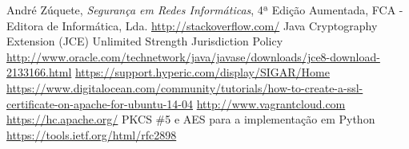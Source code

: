 \documentclass[pdftex,12pt,a4paper]{report}
\begin{document}
\begin{thebibliography}{} 
	 André Zúquete, \textit{Segurança em Redes Informáticas}, 4ª Edição Aumentada, FCA - Editora de Informática, Lda.
	 \url{http://stackoverflow.com/}
	 Java Cryptography Extension (JCE) Unlimited Strength Jurisdiction Policy \url{http://www.oracle.com/technetwork/java/javase/downloads/jce8-download-2133166.html}
	 \url{https://support.hyperic.com/display/SIGAR/Home}
	 \url{https://www.digitalocean.com/community/tutorials/how-to-create-a-ssl-certificate-on-apache-for-ubuntu-14-04}
	 \url{http://www.vagrantcloud.com}
	 \url{https://hc.apache.org/}
	 PKCS {\#}5 e AES para a implementação em Python \url{https://tools.ietf.org/html/rfc2898}
\end{thebibliography}
\end{document}
